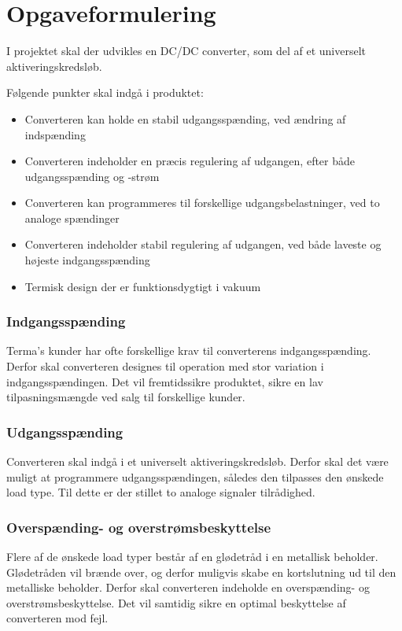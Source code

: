 

\section{Opgaveformulering}
I projektet skal der udvikles en DC/DC converter, som del af et universelt aktiveringskredsløb.   

\noindent Følgende punkter skal indgå i produktet:
\begin{itemize}
	\item Converteren kan holde en stabil udgangsspænding, ved ændring af indspænding
	\item Converteren indeholder en præcis regulering af udgangen, efter både udgangsspænding og -strøm
	\item Converteren kan programmeres til forskellige udgangsbelastninger, ved to analoge spændinger
	\item Converteren indeholder stabil regulering af udgangen, ved både laveste og højeste indgangsspænding
	\item Termisk design der er funktionsdygtigt i vakuum 
\end{itemize}

\subsubsection*{Indgangsspænding}
\noindent Terma's kunder har ofte forskellige krav til converterens indgangsspænding. Derfor skal converteren designes til operation med stor variation i indgangsspændingen. Det vil fremtidssikre produktet, sikre en lav tilpasningsmængde ved salg til forskellige kunder.  

\subsubsection*{Udgangsspænding}
\noindent Converteren skal indgå i et universelt aktiveringskredsløb. Derfor skal det være muligt at programmere udgangsspændingen, således den tilpasses den ønskede load type. Til dette er der stillet to analoge signaler tilrådighed. 

\subsubsection*{Overspænding- og overstrømsbeskyttelse}
\noindent Flere af de ønskede load typer består af en glødetråd i en metallisk beholder. Glødetråden vil brænde over, og derfor muligvis skabe en kortslutning ud til den metalliske beholder. Derfor skal converteren indeholde en overspænding- og overstrømsbeskyttelse. Det vil samtidig sikre en optimal beskyttelse af converteren mod fejl.

